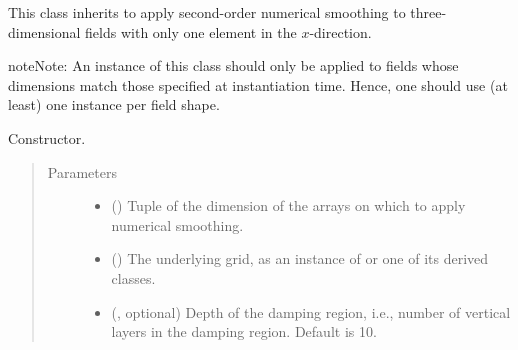 \documentclass[letterpaper,10pt,english]{sphinxmanual}
\begin{document}

\begin{fulllineitems}
\label{\detokenize{api:dycore.horizontal_smoothing.HorizontalSmoothingSecondOrderYZ}}
This class inherits {\hyperref[\detokenize{api:dycore.horizontal_smoothing.HorizontalSmoothing}]{}} to apply second-order numerical smoothing to
three-dimensional fields with only one element in the \(x\)-direction.

\begin{sphinxadmonition}{note}{Note:}
An instance of this class should only be applied to fields whose dimensions match those specified at instantiation time.
Hence, one should use (at least) one instance per field shape.
\end{sphinxadmonition}

\begin{fulllineitems}
\label{\detokenize{api:dycore.horizontal_smoothing.HorizontalSmoothingSecondOrderYZ.__init__}}
Constructor.
\begin{quote}\begin{description}
\item[{Parameters}] \leavevmode\begin{itemize}
\item {} 
 () \textendash{} Tuple of the dimension of the arrays on which to apply numerical smoothing.

\item {} 
 () \textendash{} The underlying grid, as an instance of {\hyperref[\detokenize{api:grids.grid_xyz.GridXYZ}]{}} or one of its derived classes.

\item {} 
 (, optional) \textendash{} Depth of the damping region, i.e., number of vertical layers in the damping region. Default is 10.


\end{itemize}
\end{description}
\end{quote}
\end{fulllineitems}
\end{fulllineitems}
\end{document}
